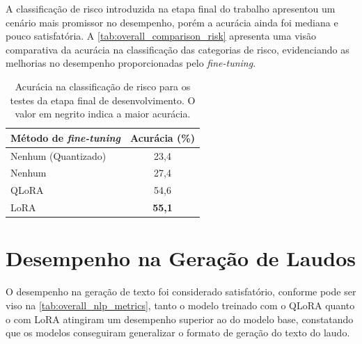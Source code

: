A classificação de risco introduzida na etapa final do trabalho apresentou um cenário mais promissor no desempenho,
porém a acurácia ainda foi mediana e pouco satisfatória. A \autoref{tab:overall_comparison_risk} apresenta uma visão
comparativa da acurácia na classificação das categorias de risco, evidenciando as melhorias no desempenho
proporcionadas pelo \textit{fine-tuning}.

\begin{table}[ht]
    \caption{\small Acurácia na classificação de risco para os testes da etapa final de desenvolvimento. O valor em
    negrito indica a maior acurácia.}
    \centering
    \begin{tabular}{l|c}
        \hline
        Método de \textit{fine-tuning} & Acurácia (\%) \\ \hline
        Nenhum (Quantizado)            & 23,4          \\
        Nenhum                         & 27,4          \\
        \ac{QLoRA}                     & 54,6          \\
        \ac{LoRA}                      & \textbf{55,1} \\ \hline
    \end{tabular}
    \label{tab:overall_comparison_risk}
\end{table}

\section{Desempenho na Geração de Laudos}

O desempenho na geração de texto foi considerado satisfatório, conforme pode ser viso na
\autoref{tab:overall_nlp_metrics}, tanto o modelo treinado com o \ac{QLoRA} quanto o com \ac{LoRA} atingiram um
desempenho superior ao do modelo base, constatando que os modelos conseguiram generalizar o formato de geração do texto
do laudo.

